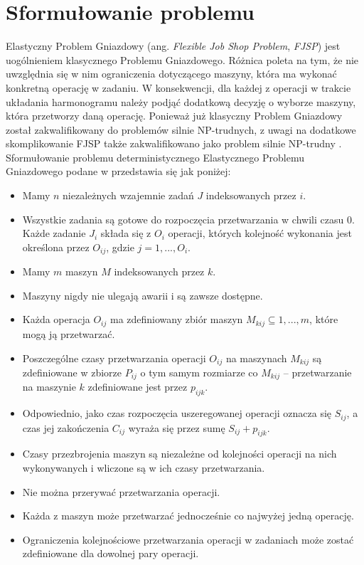 \documentclass[printmode,oneside]{mgr}
\begin{document}
\chapter{Sformułowanie problemu \label{ch_problem_def}}
Elastyczny Problem Gniazdowy (ang. \emph{Flexible Job Shop Problem}, \emph{FJSP}) jest uogólnieniem klasycznego Problemu Gniazdowego. Różnica poleta na tym, że nie uwzględnia się w nim ograniczenia dotyczącego maszyny, która ma wykonać konkretną operację w zadaniu. W konsekwencji, dla każdej z operacji w trakcie układania harmonogramu należy podjąć dodatkową decyzję o wyborze maszyny, która przetworzy daną operację. Ponieważ już klasyczny Problem Gniazdowy został zakwalifikowany do problemów silnie NP-trudnych, z uwagi na dodatkowe skomplikowanie FJSP także zakwalifikowano jako problem silnie NP-trudny \cite{Tay2004}. Sformułowanie problemu deterministycznego Elastycznego Problemu Gniazdowego podane w \cite{AEHGAFJS_ElMekkawy11} przedstawia się jak poniżej:
\begin{itemize}
    \item Mamy $n$ niezależnych wzajemnie zadań $J$ indeksowanych przez $i$.
    \item Wszystkie zadania są gotowe do rozpoczęcia przetwarzania w chwili czasu 0.
    Każde zadanie $J_i$ składa się z $O_i$ operacji, których kolejność wykonania jest określona przez $O_{ij}$, gdzie $j = 1, ..., O_i$.
    \item Mamy $m$ maszyn $M$ indeksowanych przez $k$.
    \item Maszyny nigdy nie ulegają awarii i są zawsze dostępne.
    \item Każda operacja $O_{ij}$ ma zdefiniowany zbiór maszyn $M_{kij} \subseteq {1, ..., m}$, które mogą ją przetwarzać.
    \item Poszczególne czasy przetwarzania operacji $O_{ij}$ na maszynach $M_{kij}$ są zdefiniowane w zbiorze $P_{ij}$ o tym samym rozmiarze co $M_{kij}$ -- przetwarzanie na maszynie $k$ zdefiniowane jest przez $p_{ijk}$.
    \item Odpowiednio, jako czas rozpoczęcia uszeregowanej operacji oznacza się $S_{ij}$, a czas jej zakończenia $C_{ij}$ wyraża się przez sumę $S_{ij} + p_{ijk}$.
    \item Czasy przezbrojenia maszyn są niezależne od kolejności operacji na nich wykonywanych i wliczone są w ich czasy przetwarzania.
    \item Nie można przerywać przetwarzania operacji.
    \item Każda z maszyn może przetwarzać jednocześnie co najwyżej jedną operację.
    \item Ograniczenia kolejnościowe przetwarzania operacji w zadaniach może zostać zdefiniowane dla dowolnej pary operacji.
\end{itemize}
\end{document}
